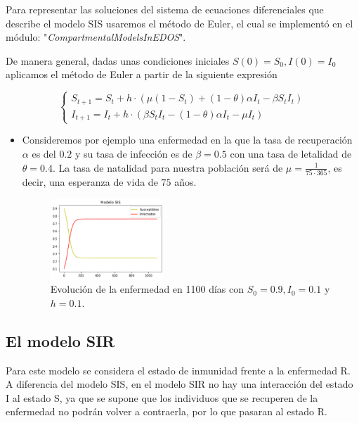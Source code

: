 Para representar las soluciones del sistema de ecuaciones diferenciales que describe el modelo SIS usaremos el método de Euler, el cual se implementó en el módulo: "\textit{CompartmentalModelsInEDOS}".

De manera general, dadas unas condiciones iniciales $S(0)=S_0,I(0)=I_0$ aplicamos el método de Euler a partir de la siguiente expresión

$$\left\{\begin{array}{l}
S_{t+1} = S_t + h\cdot(\mu(1 - S_t) + (1 - \theta)\alpha I_t - \beta S_t I_t ) \\
I_{t+1} = I_t + h\cdot(\beta S_t I_t - (1 - \theta)\alpha I_t - \mu I_t)
\end{array}\right.$$

\begin{itemize}
    \item Consideremos por ejemplo una enfermedad en la que la tasa de recuperación $\alpha$ es del $0.2$ y su tasa de infección es de $\beta=0.5$ con una tasa de letalidad de $\theta=0.4$. La tasa de natalidad para nuestra población será de $\mu=\frac{1}{75\cdot365}$, es decir, una esperanza de vida de $75$ años.
    
    \begin{figure}[h]
      \centering
        \includegraphics[width=0.4\textwidth]{Imagenes/ex1SIS.PNG}
      \caption{Evolución de la enfermedad en 1100 días con $S_0=0.9,I_0=0.1$ y $h=0.1$.}
      \label{fig:Ejemplo 1 - SIS}
    \end{figure}
\end{itemize}

\subsection{El modelo SIR}\label{sub:El modelo SIR}

Para este modelo se considera el estado de inmunidad frente a la enfermedad R. A diferencia del modelo SIS, en el modelo SIR no hay una interacción del estado I al estado S, ya que se supone que los individuos que se recuperen de la enfermedad no podrán volver a contraerla, por lo que pasaran al estado R. 

